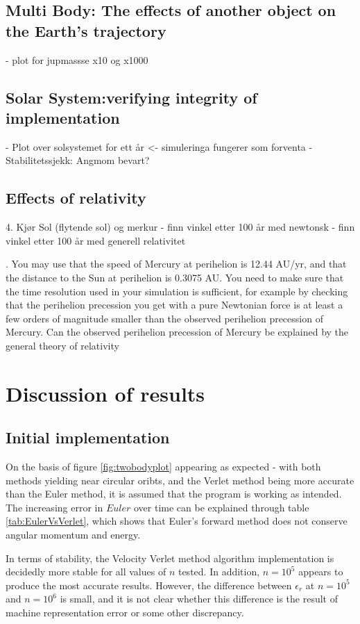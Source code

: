 \documentclass[%
oneside,                 %
final,                   %
10pt]{article}
\begin{document}
\subsection{Multi Body: The effects of another object on the Earth's trajectory}
    - plot for jupmassse x10 og x1000

\subsection{Solar System:verifying integrity of implementation }
- Plot over solsystemet for ett år <- simuleringa fungerer som forventa
- Stabilitetssjekk: Angmom bevart? 

\subsection{Effects of relativity}
4. Kjør Sol (flytende sol) og merkur 
- finn vinkel etter 100 år med newtonsk
- finn vinkel etter 100 år med generell relativitet

. You may use that the speed of Mercury
at perihelion is 12.44 AU/yr, and that the distance to the Sun at perihelion
is 0.3075 AU.
You need to make sure that the time resolution used in your
simulation is sufficient, for example by checking that the perihelion precession
you get with a pure Newtonian force is at least a few orders of magnitude smaller
than the observed perihelion precession of Mercury. Can the observed perihelion
precession of Mercury be explained by the general theory of relativity

\section{Discussion of results}
\subsection{Initial implementation}
\label{subsec:Discofres:initimpl}

On the basis of figure \ref{fig:twobodyplot} appearing as expected - with both methods yielding near circular oribts, and the Verlet method being more accurate than the Euler method, it is assumed that the program is working as intended. The increasing error in $Euler$ over time can be explained through table \ref{tab:EulerVsVerlet}, which shows that Euler's forward method does not conserve angular momentum and energy. \newline

In terms of stability, the Velocity Verlet method algorithm implementation is decidedly more stable for all values of $n$ tested. In addition, $n=10^5$ appears to produce the most accurate results. However, the difference between $\epsilon_r$ at $n=10^5$ and $n=10^6$ is small, and it is not clear whether this difference is the result of machine representation error or some other discrepancy.\newline
\end{document}

